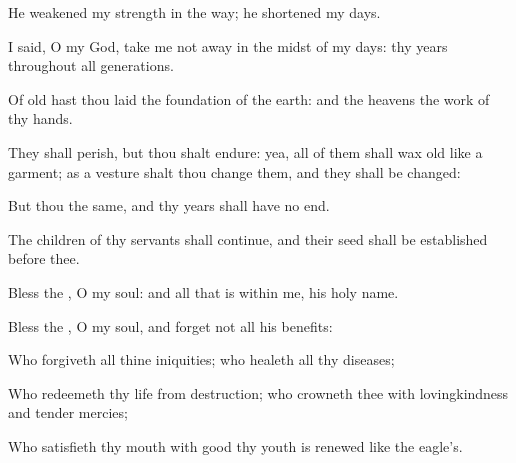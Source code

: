{\Q {}He
weakened my
strength in the
way; he
shortened my
days.


\par }{\Q {}I
said, O my
God, take me not
away in the
midst of my
days: thy
years
{} throughout
all
generations.


\par }{\Q {}Of
old hast thou laid the
foundation of the
earth: and the
heavens
{} the
work of thy
hands.


\par }{\Q {}They shall
perish, but thou shalt
endure: yea, all of them shall wax
old like a
garment; as a
vesture shalt thou
change them, and they shall be
changed:


\par }{\Q {}But thou
{} the same, and thy
years shall have no
end.


\par }{\Q {}The
children of thy
servants shall
continue, and their
seed shall be
established
before thee.




\par }
{\Q {}Bless the
{}, O my
soul: and all that is
within me,
{} his
holy
name.


\par }{\Q {}Bless the
{}, O my
soul, and
forget not all his
benefits:


\par }{\Q {}Who
forgiveth all thine
iniquities; who
healeth all thy
diseases;


\par }{\Q {}Who
redeemeth thy
life from
destruction; who
crowneth thee with
lovingkindness and tender
mercies;


\par }{\Q {}Who
satisfieth thy
mouth with
good
{} thy
youth is
renewed like the
eagle’s.


\par }{\BB \par }

